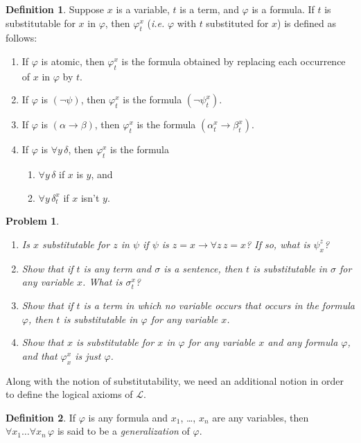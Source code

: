 \documentclass[12pt]{amsbook}
\theoremstyle{plain}
\newtheorem{prob}[thm]{Problem}
\theoremstyle{definition}
\newtheorem{defn}{Definition}[chapter]
\theoremstyle{remark}
\begin{document}
\begin{defn} \label{d:subst} 
Suppose $x$ is a variable,  $t$ is a term,  and $\varphi$ is a formula.  If $t$ is substitutable for $x$ in $\varphi$,  then $\varphi^x_t$ ({\em i.e.\/} $\varphi$ with $t$ substituted for $x$) is defined as follows:
\begin{enumerate}
\item If $\varphi$ is atomic,  then $\varphi^x_t$ is the formula obtained by replacing each occurrence of $x$ in $\varphi$ by $t$. 
\item If $\varphi$ is $(\lnot \psi)$,  then $\varphi^x_t$ is the formula $(\lnot \psi^x_t)$.
\item If $\varphi$ is $(\alpha \to \beta)$,  then $\varphi^x_t$ is the formula $(\alpha^x_t \to \beta^x_t)$.
\item If $\varphi$ is $\forall y \, \delta$,  then $\varphi^x_t$ is the formula 
 \begin{enumerate}
  \item $\forall y \, \delta$ if $x$ is $y$,  and 
  \item $\forall y \, \delta^x_t$ if $x$ isn't $y$.
 \end{enumerate}
\end{enumerate}
\end{defn}


\begin{prob} \label{p:subs}
\begin{enumerate}
\item Is $x$ substitutable for $z$ in $\psi$ if $\psi$ is $z = x \to \forall z\, z = x$?  If so,  what is $\psi^z_x$?
\item Show that if $t$ is any term and $\sigma$ is a sentence,  then $t$ is substitutable in $\sigma$ for any variable $x$.  What is $\sigma^x_t$?
\item Show that if $t$ is a term in which no variable occurs that occurs in the formula $\varphi$,  then $t$ is substitutable in $\varphi$ for any variable $x$.
\item Show that $x$ is substitutable for $x$ in $\varphi$ for any variable $x$ and any formula $\varphi$,  and that $\varphi^x_x$ is just $\varphi$.
\end{enumerate}
\end{prob}

Along with the notion of substitutability,  we need an additional notion in order to define the logical axioms of $\mathcal{L}$.  

\begin{defn} 
If $\varphi$ is any formula and $x_1$, \dots, $x_n$ are any  variables,  then $\forall x_1 \dots \forall x_n \, \varphi$ is said to be a {\em generalization\/} of $\varphi$.
\end{defn}
\end{document}
